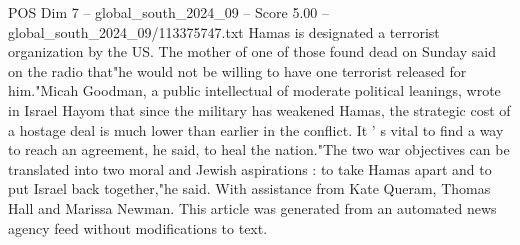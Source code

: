 \begin{textsample}{POS Dim 7 – global\_south\_2024\_09 – Score 5.00 – global\_south\_2024\_09/113375747.txt}
Hamas is designated a terrorist organization by the US.
The mother of one of those found dead on Sunday said on the radio that"he would not be willing to have one terrorist released for him."Micah Goodman, a public intellectual of moderate political leanings, wrote in Israel Hayom that since the military has weakened Hamas, the strategic cost of a hostage deal is much lower than earlier in the conflict.
It ' s vital to find a way to reach an agreement, he said, to heal the nation."The two war objectives can be translated into two moral and Jewish aspirations : to take Hamas apart and to put Israel back together,"he said.
With assistance from Kate Queram, Thomas Hall and Marissa Newman.
This article was generated from an automated news agency feed without modifications to text.

\end{textsample}
